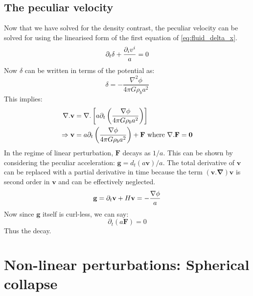 \documentclass[12pt,a4paper,oneside]{book}
\def\pa{{\partial}}
\begin{document}
		\subsection{The peculiar velocity}
			Now that we have solved for the density contrast, the peculiar velocity can be solved for using the linearised form of the first equation of \ref{eq:fluid_delta_x}.
			$$
				\pa_t\delta+\frac{\pa_iv^i}{a}=0\\
			$$
			Now $\delta$ can be written in terms of the potential as:
			$$
				\delta=-\frac{\nabla^2\phi}{4\pi G\rho_ba^2}
			$$
			This implies:
			$$
			\begin{aligned}
				\nabla.\mathbf{v}&=\nabla.\left[a\pa_t\left(\frac{\nabla\phi}{4\pi G\rho_ba^2}\right)\right]\\
				\Rightarrow\mathbf{v}&=a\pa_t\left(\frac{\nabla\phi}{4\pi G\rho_ba^2}\right)+\mathbf{F}\text{ where $\bf{\nabla.F}=0$}\\
			\end{aligned}
			$$
			In the regime of linear perturbation, $\mathbf{F}$ decays as $1/a$. This can be shown by considering the peculiar acceleration: $\mathbf{g}=d_t(a\mathbf{v})/a$. The total derivative of $\mathbf{v}$ can be replaced with a partial derivative in time because the term $\mathbf{(v.\nabla)v}$ is second order in $\mathbf{v}$ and can be effectively neglected.
			$$
			\mathbf{g}=\pa_t\mathbf{v}+H\mathbf{v}=-\frac{\nabla\phi}{a}\\
			$$
			Now since $\mathbf{g}$ itself is curl-less, we can say:
			$$
				\pa_t(a\mathbf{F})=0
			$$
			Thus the decay.
	\section{Non-linear perturbations: Spherical collapse}
		
\end{document}
